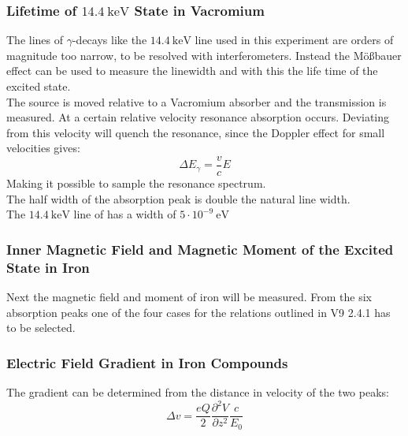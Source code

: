 \subsubsection{Lifetime of $14.4 \ \text{keV}$ State in Vacromium}

The lines of $\gamma$-decays like the $14.4 \ \text{keV}$ line used in this experiment are orders of magnitude too narrow, to be resolved with interferometers.
Instead the Mößbauer effect can be used to measure the linewidth and with this the life time of the excited state.\\

The  source is moved relative to a Vacromium absorber and the transmission is measured. At a certain relative velocity resonance absorption occurs. Deviating from this velocity will quench the resonance, since the Doppler effect for small velocities gives:
$$\Delta E_\gamma = \frac{v}{c} E$$
Making it possible to sample the resonance spectrum.\\
The half width of the absorption peak is double the natural line width.\\


The $14.4 \ \text{keV}$ line of  has a width of $5 \cdot 10^{-9} \ \text{eV}$


\subsubsection{Inner Magnetic Field and Magnetic Moment of the Excited State in Iron}
Next the magnetic field and moment of iron will be measured. From the six absorption peaks one of the four cases for the relations outlined in V9 2.4.1 has to be selected.

\subsubsection{Electric Field Gradient in Iron Compounds}
The gradient can be determined from the distance in velocity of the two peaks:
$$\Delta v = \frac{eQ}{2} \frac{\partial^2V}{\partial z^2} \frac{c}{E_0}$$

